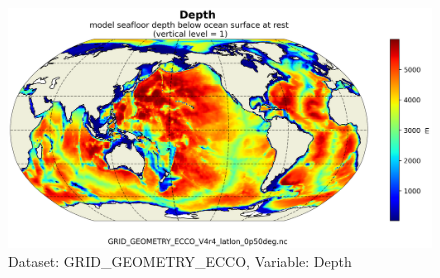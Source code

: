 \begin{figure}[H]
\centering
\includegraphics[scale=0.55]{../images/plots/latlon_plots_coords/Geometry_Parameters_for_the_0.5_degree_Lat-Lon_Model_Grid_(Version_4_Release_4)/Depth.png}
\caption{Dataset: GRID\_GEOMETRY\_ECCO, Variable: Depth}
\label{tab:table-GRID_GEOMETRY_ECCO_Depth-Plot}
\end{figure}
\newpage
\pagebreak
